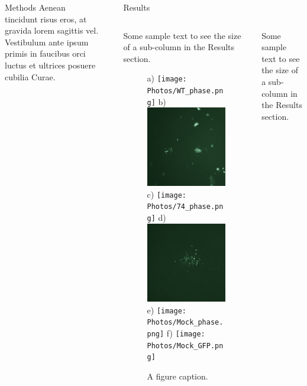 \documentclass[final]{beamer}
\newlength{\sepwidth}
\newlength{\colwidth}
\newcommand{\separatorcolumn}{\begin{column}{\sepwidth}\end{column}}
\begin{document}
\begin{frame}[t]
\begin{columns}[t]
\begin{column}{\colwidth}
\begin{alertblock}{Methods}
    Aenean tincidunt risus eros, at gravida lorem sagittis vel. Vestibulum ante
    ipsum primis in faucibus orci luctus et ultrices posuere cubilia Curae.

  \end{alertblock}

\end{column}

\separatorcolumn

\setlength{\colwidth}{0.4\paperwidth}
\begin{column}{\colwidth}

  \begin{block}{Results}
  	\begin{columns}[t, totalwidth=\textwidth]
    	\begin{column}{0.49\linewidth}
    	Some sample text to see the size of a sub-column in the Results section.
        \begin{figure}
      	  \centering
          a)
     		 \texttt{[image: Photos/WT\_phase.png]}
          b)
             \includegraphics[width=0.25\linewidth]{Photos/WT_GFP.png}\\
          c)
             \texttt{[image: Photos/74\_phase.png]}
          d)
             \includegraphics[width=0.25\linewidth]{Photos/74_GFP.png}\\
          e)
             \texttt{[image: Photos/Mock\_phase.png]}
          f)
             \texttt{[image: Photos/Mock\_GFP.png]}
      		\caption{A figure caption.}
    	\end{figure}
    	\end{column}
        
  		\begin{column}{0.49\linewidth}
    	Some sample text to see the size of a sub-column in the Results section.
    	\end{column}
  	\end{columns}
  \end{block}


\end{column}
\end{columns}
\end{frame}
\end{document}
